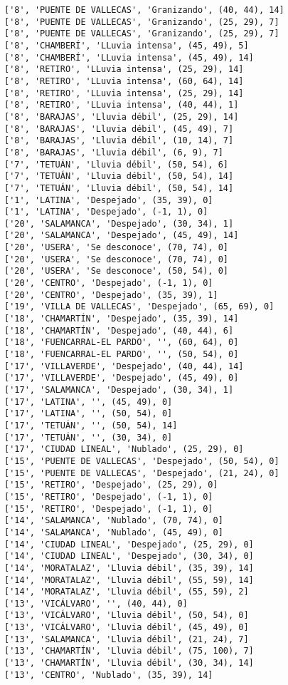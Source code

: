 \documentclass[11pt]{article}
\begin{document}
\begin{Verbatim}[commandchars=\\\{\}]
['8', 'PUENTE DE VALLECAS', 'Granizando', (40, 44), 14]
['8', 'PUENTE DE VALLECAS', 'Granizando', (25, 29), 7]
['8', 'PUENTE DE VALLECAS', 'Granizando', (25, 29), 7]
['8', 'CHAMBERÍ', 'LLuvia intensa', (45, 49), 5]
['8', 'CHAMBERÍ', 'LLuvia intensa', (45, 49), 14]
['8', 'RETIRO', 'LLuvia intensa', (25, 29), 14]
['8', 'RETIRO', 'LLuvia intensa', (60, 64), 14]
['8', 'RETIRO', 'LLuvia intensa', (25, 29), 14]
['8', 'RETIRO', 'LLuvia intensa', (40, 44), 1]
['8', 'BARAJAS', 'Lluvia débil', (25, 29), 14]
['8', 'BARAJAS', 'Lluvia débil', (45, 49), 7]
['8', 'BARAJAS', 'Lluvia débil', (10, 14), 7]
['8', 'BARAJAS', 'Lluvia débil', (6, 9), 7]
['7', 'TETUÁN', 'Lluvia débil', (50, 54), 6]
['7', 'TETUÁN', 'Lluvia débil', (50, 54), 14]
['7', 'TETUÁN', 'Lluvia débil', (50, 54), 14]
['1', 'LATINA', 'Despejado', (35, 39), 0]
['1', 'LATINA', 'Despejado', (-1, 1), 0]
['20', 'SALAMANCA', 'Despejado', (30, 34), 1]
['20', 'SALAMANCA', 'Despejado', (45, 49), 14]
['20', 'USERA', 'Se desconoce', (70, 74), 0]
['20', 'USERA', 'Se desconoce', (70, 74), 0]
['20', 'USERA', 'Se desconoce', (50, 54), 0]
['20', 'CENTRO', 'Despejado', (-1, 1), 0]
['20', 'CENTRO', 'Despejado', (35, 39), 1]
['19', 'VILLA DE VALLECAS', 'Despejado', (65, 69), 0]
['18', 'CHAMARTÍN', 'Despejado', (35, 39), 14]
['18', 'CHAMARTÍN', 'Despejado', (40, 44), 6]
['18', 'FUENCARRAL-EL PARDO', '', (60, 64), 0]
['18', 'FUENCARRAL-EL PARDO', '', (50, 54), 0]
['17', 'VILLAVERDE', 'Despejado', (40, 44), 14]
['17', 'VILLAVERDE', 'Despejado', (45, 49), 0]
['17', 'SALAMANCA', 'Despejado', (30, 34), 1]
['17', 'LATINA', '', (45, 49), 0]
['17', 'LATINA', '', (50, 54), 0]
['17', 'TETUÁN', '', (50, 54), 14]
['17', 'TETUÁN', '', (30, 34), 0]
['17', 'CIUDAD LINEAL', 'Nublado', (25, 29), 0]
['15', 'PUENTE DE VALLECAS', 'Despejado', (50, 54), 0]
['15', 'PUENTE DE VALLECAS', 'Despejado', (21, 24), 0]
['15', 'RETIRO', 'Despejado', (25, 29), 0]
['15', 'RETIRO', 'Despejado', (-1, 1), 0]
['15', 'RETIRO', 'Despejado', (-1, 1), 0]
['14', 'SALAMANCA', 'Nublado', (70, 74), 0]
['14', 'SALAMANCA', 'Nublado', (45, 49), 0]
['14', 'CIUDAD LINEAL', 'Despejado', (25, 29), 0]
['14', 'CIUDAD LINEAL', 'Despejado', (30, 34), 0]
['14', 'MORATALAZ', 'Lluvia débil', (35, 39), 14]
['14', 'MORATALAZ', 'Lluvia débil', (55, 59), 14]
['14', 'MORATALAZ', 'Lluvia débil', (55, 59), 2]
['13', 'VICÁLVARO', '', (40, 44), 0]
['13', 'VICÁLVARO', 'Lluvia débil', (50, 54), 0]
['13', 'VICÁLVARO', 'Lluvia débil', (45, 49), 0]
['13', 'SALAMANCA', 'Lluvia débil', (21, 24), 7]
['13', 'CHAMARTÍN', 'Lluvia débil', (75, 100), 7]
['13', 'CHAMARTÍN', 'Lluvia débil', (30, 34), 14]
['13', 'CENTRO', 'Nublado', (35, 39), 14]

\end{Verbatim}
\end{document}
